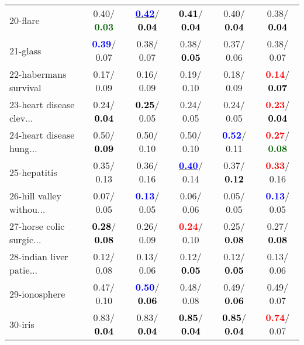 \begin{table}[h]
\begin{center}
\begin{tabular}{lc|c|c|c|c}
20-flare &   0.40/\textcolor{darkgreen}{\textbf{  0.03}} & \underline{\textcolor{blue}{\textbf{  0.42}}}/\textcolor{black}{\textbf{  0.04}} & \textcolor{black}{\textbf{  0.41}}/\textcolor{black}{\textbf{  0.04}} &   0.40/\textcolor{black}{\textbf{  0.04}} &   0.38/\textcolor{black}{\textbf{  0.04}} \\
21-glass & \textcolor{blue}{\textbf{  0.39}}/  0.07 &   0.38/  0.07 &   0.38/\textcolor{black}{\textbf{  0.05}} &   0.37/  0.06 &   0.38/  0.07 \\ \hline
22-habermans survival &   0.17/  0.09 &   0.16/  0.09 &   0.19/  0.10 &   0.18/  0.09 & \textcolor{red}{\textbf{  0.14}}/\textcolor{black}{\textbf{  0.07}} \\
23-heart disease clev... &   0.24/\textcolor{black}{\textbf{  0.04}} & \textcolor{black}{\textbf{  0.25}}/  0.05 &   0.24/  0.05 &   0.24/  0.05 & \textcolor{red}{\textbf{  0.23}}/\textcolor{black}{\textbf{  0.04}} \\
24-heart disease hung... &   0.50/\textcolor{black}{\textbf{  0.09}} &   0.50/  0.10 &   0.50/  0.10 & \textcolor{blue}{\textbf{  0.52}}/  0.11 & \textcolor{red}{\textbf{  0.27}}/\textcolor{darkgreen}{\textbf{  0.08}} \\
25-hepatitis &   0.35/  0.13 &   0.36/  0.16 & \underline{\textcolor{blue}{\textbf{  0.40}}}/  0.14 &   0.37/\textcolor{black}{\textbf{  0.12}} & \textcolor{red}{\textbf{  0.33}}/  0.16 \\
26-hill valley withou... &   0.07/  0.05 & \textcolor{blue}{\textbf{  0.13}}/  0.05 &   0.06/  0.06 &   0.05/  0.05 & \textcolor{blue}{\textbf{  0.13}}/  0.05 \\
27-horse colic surgic... & \textcolor{black}{\textbf{  0.28}}/\textcolor{black}{\textbf{  0.08}} &   0.26/  0.09 & \textcolor{red}{\textbf{  0.24}}/  0.10 &   0.25/\textcolor{black}{\textbf{  0.08}} &   0.27/\textcolor{black}{\textbf{  0.08}} \\
28-indian liver patie... &   0.12/  0.08 &   0.13/  0.06 &   0.12/\textcolor{black}{\textbf{  0.05}} &   0.12/\textcolor{black}{\textbf{  0.05}} &   0.13/  0.06 \\ \hline
29-ionosphere &   0.47/  0.10 & \textcolor{blue}{\textbf{  0.50}}/\textcolor{black}{\textbf{  0.06}} &   0.48/  0.08 &   0.49/\textcolor{black}{\textbf{  0.06}} &   0.49/  0.07 \\
30-iris &   0.83/\textcolor{black}{\textbf{  0.04}} &   0.83/\textcolor{black}{\textbf{  0.04}} & \textcolor{black}{\textbf{  0.85}}/\textcolor{black}{\textbf{  0.04}} & \textcolor{black}{\textbf{  0.85}}/\textcolor{black}{\textbf{  0.04}} & \textcolor{red}{\textbf{  0.74}}/  0.07 \\

\end{tabular}
\end{center}
\end{table}
